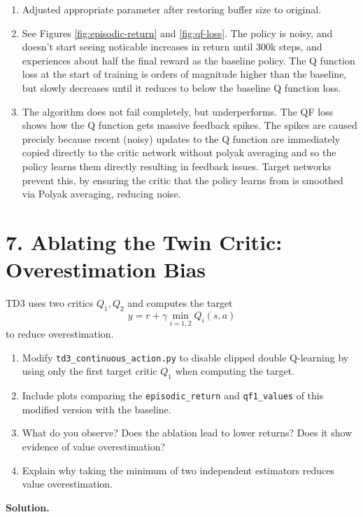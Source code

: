 \documentclass[11pt]{article}
\begin{document}
\begin{enumerate}
    \item[(a)] Adjusted appropriate parameter after restoring buffer size to original.
    \item[(b)] See Figures \ref{fig:episodic-return} and \ref{fig:qf-loss}. The policy is noisy, and doesn't start seeing noticable increases in return until 300k steps, and experiences about half the final reward as the baseline policy.
        The Q function loss at the start of training is orders of magnitude higher than the baseline, but slowly decreases until it reduces to below the baseline Q function loss.
    \item[(c)] The algorithm does not fail completely, but underperforms. 
        The QF loss shows how the Q function gets massive feedback spikes. 
        The spikes are caused precisly because recent (noisy) updates to the Q function are immediately copied directly to the critic network without polyak averaging and so the policy learns them directly resulting in feedback issues.
        Target networks prevent this, by ensuring the critic that the policy learns from is smoothed via Polyak averaging, reducing noise.
\end{enumerate}

\section*{7. Ablating the Twin Critic: Overestimation Bias}
TD3 uses two critics $Q_1, Q_2$ and computes the target
\[
y = r + \gamma \min_{i=1,2} Q_i(s,a)
\]
to reduce overestimation.
\begin{enumerate}
    \item[(a)] Modify \texttt{td3\_continuous\_action.py} to disable clipped double Q-learning by using only the first target critic $Q_1$ when computing the target.
    \item[(b)] Include plots comparing the \texttt{episodic\_return} and \texttt{qf1\_values} of this modified version with the baseline.
    \item[(c)] What do you observe? Does the ablation lead to lower returns? Does it show evidence of value overestimation?
    \item[(d)] Explain why taking the minimum of two independent estimators reduces value overestimation.
\end{enumerate}

\textbf{Solution.}
\end{document}
